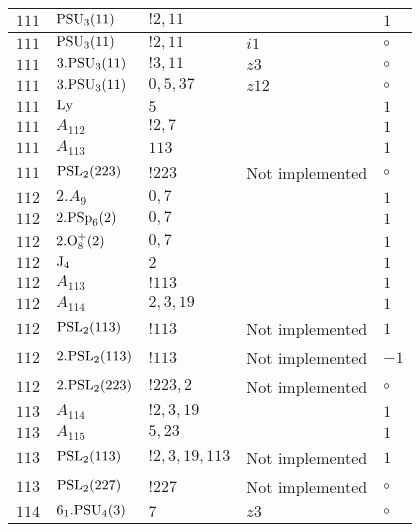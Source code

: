 \documentclass[a4paper, 11pt]{article}
\begin{document}
\begin{longtable}{lllll}
        $ 111 $ & $ {\rm PSU}_{3}(11) $ & $ ! 2,11 $ & $ ~ $ & $ 1$ \\ \hline
        $ 111 $ & $ {\rm PSU}_{3}(11) $ & $ ! 2,11 $ & $ i1 $ &  $\circ$ \\ \hline
        $ 111 $ & $ 3.{\rm PSU}_{3}(11) $ & $ ! 3,11 $ & $ z3 $ &  $\circ$ \\ \hline
        $ 111 $ & $ 3.{\rm PSU}_{3}(11) $ & $ 0,5,37 $ & $ z12 $ &  $\circ$ \\ \hline
        $ 111 $ & $ {\rm Ly} $ & $ 5 $ & $ ~ $ & $ 1$ \\ \hline
        $ 111 $ & $ A_{112} $ & $ !2, 7 $ & $ ~ $ & $ 1$ \\ \hline
        $ 111 $ & $ A_{113} $ & $ 113 $ & $ ~ $ & $ 1$ \\ \hline
        $ 111 $ & $ {\rm PSL}_{2}(223) $ & $ !223 $ &  Not implemented &  $\circ$ \\ \hline
        $ 112 $ & $ 2.A_{9} $ & $ 0,7 $ & $ ~ $ & $ 1$ \\ \hline
        $ 112 $ & $ 2.{\rm PSp}_{6}(2) $ & $ 0,7 $ & $ ~ $ & $ 1$ \\ \hline
        $ 112 $ & $ 2.{\rm O}_{8}^+(2) $ & $ 0,7 $ & $ ~ $ & $ 1$ \\ \hline
        $ 112 $ & $ {\rm J}_{4} $ & $ 2 $ & $ ~ $ & $ 1$ \\ \hline
        $ 112 $ & $ A_{113} $ & $ !113 $ & $ ~ $ & $ 1$ \\ \hline
        $ 112 $ & $ A_{114} $ & $ 2, 3, 19 $ & $ ~ $ & $ 1$ \\ \hline
        $ 112 $ & $ {\rm PSL}_{2}(113) $ & $ !113 $ &  Not implemented & $ 1$ \\ \hline
        $ 112 $ & $ 2.{\rm PSL}_{2}(113) $ & $ !113 $ &  Not implemented & $ -1$ \\ \hline
        $ 112 $ & $ 2.{\rm PSL}_{2}(223) $ & $ !223, 2 $ &  Not implemented &  $\circ$ \\ \hline
        $ 113 $ & $ A_{114} $ & $ !2, 3, 19 $ & $ ~ $ & $ 1$ \\ \hline
        $ 113 $ & $ A_{115} $ & $ 5, 23 $ & $ ~ $ & $ 1$ \\ \hline
        $ 113 $ & $ {\rm PSL}_{2}(113) $ & $ !2, 3, 19, 113 $ &  Not implemented & $ 1$ \\ \hline
        $ 113 $ & $ {\rm PSL}_{2}(227) $ & $ !227 $ &  Not implemented &  $\circ$ \\ \hline
        $ 114 $ & $ 6_1.{\rm PSU}_{4}(3) $ & $ 7 $ & $ z3 $ &  $\circ$ \\ \hline

\end{longtable}
\end{document}
